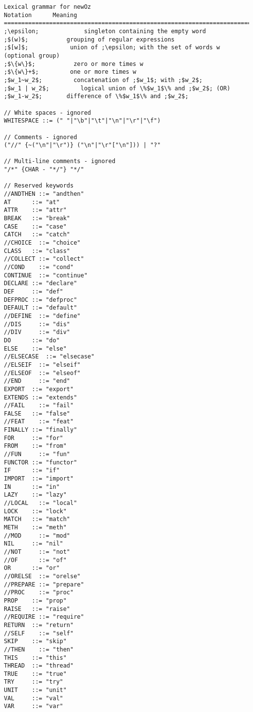 \begin{lstlisting}[label={lst:newOzLexical},language=ebnf]
Lexical grammar for newOz
Notation      Meaning
===========================================================================
;\epsilon;             singleton containing the empty word
;$(w)$;           grouping of regular expressions
;$[w]$;            union of ;\epsilon; with the set of words w (optional group)
;$\{w\}$;           zero or more times w
;$\{w\}+$;         one or more times w
;$w_1~w_2$;         concatenation of ;$w_1$; with ;$w_2$;
;$w_1 | w_2$;         logical union of \%$w_1$\% and ;$w_2$; (OR)
;$w_1-w_2$;       difference of \%$w_1$\% and ;$w_2$;

// White spaces - ignored
WHITESPACE ::= (" "|"\b"|"\t"|"\n"|"\r"|"\f")

// Comments - ignored
("//" {~("\n"|"\r")} ("\n"|"\r"["\n"])) | "?"

// Multi-line comments - ignored
"/*" {CHAR - "*/"} "*/"

// Reserved keywords
//ANDTHEN ::= "andthen"
AT      ::= "at"
ATTR    ::= "attr"
BREAK   ::= "break"
CASE    ::= "case"
CATCH   ::= "catch"
//CHOICE  ::= "choice"
CLASS   ::= "class"
//COLLECT ::= "collect"
//COND    ::= "cond"
CONTINUE  ::= "continue"
DECLARE ::= "declare"
DEF     ::= "def"
DEFPROC ::= "defproc"
DEFAULT ::= "default"
//DEFINE  ::= "define"
//DIS     ::= "dis"
//DIV     ::= "div"
DO      ::= "do"
ELSE    ::= "else"
//ELSECASE  ::= "elsecase"
//ELSEIF  ::= "elseif"
//ELSEOF  ::= "elseof"
//END     ::= "end"
EXPORT  ::= "export"
EXTENDS ::= "extends"
//FAIL    ::= "fail"
FALSE   ::= "false"
//FEAT    ::= "feat"
FINALLY ::= "finally"
FOR     ::= "for"
FROM    ::= "from"
//FUN     ::= "fun"
FUNCTOR ::= "functor"
IF      ::= "if"
IMPORT  ::= "import"
IN      ::= "in"
LAZY    ::= "lazy"
//LOCAL   ::= "local"
LOCK    ::= "lock"
MATCH   ::= "match"
METH    ::= "meth"
//MOD     ::= "mod"
NIL     ::= "nil"
//NOT     ::= "not"
//OF      ::= "of"
OR      ::= "or"
//ORELSE  ::= "orelse"
//PREPARE ::= "prepare"
//PROC    ::= "proc"
PROP    ::= "prop"
RAISE   ::= "raise"
//REQUIRE ::= "require"
RETURN  ::= "return"
//SELF    ::= "self"
SKIP    ::= "skip"
//THEN    ::= "then"
THIS    ::= "this"
THREAD  ::= "thread"
TRUE    ::= "true"
TRY     ::= "try"
UNIT    ::= "unit"
VAL     ::= "val"
VAR     ::= "var"


\end{lstlisting}
